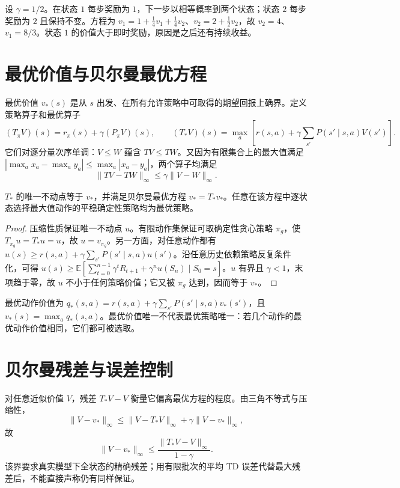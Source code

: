\begin{example}[两个状态的精确价值]
设 $\gamma=1/2$。在状态 $1$ 每步奖励为 $1$，下一步以相等概率到两个状态；状态 $2$ 每步奖励为 $2$ 且保持不变。方程为 $v_1=1+\tfrac14v_1+\tfrac14v_2$、$v_2=2+\tfrac12v_2$，故 $v_2=4$、$v_1=8/3$。状态 $1$ 的价值大于即时奖励，原因是之后还有持续收益。
\end{example}

\section{最优价值与贝尔曼最优方程}

最优价值 $v_*(s)$ 是从 $s$ 出发、在所有允许策略中可取得的期望回报上确界。定义策略算子和最优算子
\[
(T_\pi V)(s)=r_\pi(s)+\gamma(P_\pi V)(s),\qquad
(T_*V)(s)=\max_a\left[r(s,a)+\gamma\sum_{s'}P(s'\mid s,a)V(s')\right].
\]
它们对逐分量次序单调：$V\leq W$ 蕴含 $TV\leq TW$。又因为有限集合上的最大值满足 $|\max_a x_a-\max_a y_a|\leq\max_a|x_a-y_a|$，两个算子均满足
\begin{equation}
\|TV-TW\|_\infty\leq\gamma\|V-W\|_\infty.
\label{eq:rl-bellman-contraction}
\end{equation}

\begin{theorem}[有限折扣模型的最优性]
$T_*$ 的唯一不动点等于 $v_*$，并满足贝尔曼最优方程 $v_*=T_*v_*$。任意在该方程中逐状态选择最大值动作的平稳确定性策略均为最优策略。
\end{theorem}
\begin{proof}
压缩性质保证唯一不动点 $u$。有限动作集保证可取确定性贪心策略 $\pi_g$，使 $T_{\pi_g}u=T_*u=u$，故 $u=v_{\pi_g}$。另一方面，对任意动作都有 $u(s)\geq r(s,a)+\gamma\sum_{s'}P(s'\mid s,a)u(s')$。沿任意历史依赖策略反复条件化，可得 $u(s)\geq\mathbb E[\sum_{t=0}^{n-1}\gamma^tR_{t+1}+\gamma^nu(S_n)\mid S_0=s]$。$u$ 有界且 $\gamma<1$，末项趋于零，故 $u$ 不小于任何策略价值；它又被 $\pi_g$ 达到，因而等于 $v_*$。
\end{proof}

最优动作价值为 $q_*(s,a)=r(s,a)+\gamma\sum_{s'}P(s'\mid s,a)v_*(s')$，且 $v_*(s)=\max_aq_*(s,a)$。最优价值唯一不代表最优策略唯一：若几个动作的最优动作价值相同，它们都可被选取。

\section{贝尔曼残差与误差控制}

对任意近似价值 $V$，残差 $T_*V-V$ 衡量它偏离最优方程的程度。由三角不等式与压缩性，
\[
\|V-v_*\|_\infty\leq\|V-T_*V\|_\infty+\gamma\|V-v_*\|_\infty,
\]
故
\begin{equation}
\|V-v_*\|_\infty\leq\frac{\|T_*V-V\|_\infty}{1-\gamma}.
\label{eq:rl-residual-bound}
\end{equation}
该界要求真实模型下全状态的精确残差；用有限批次的平均 TD 误差代替最大残差后，不能直接声称仍有同样保证。

